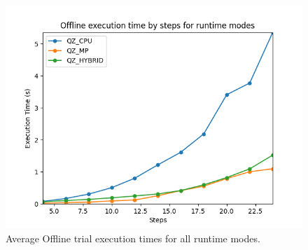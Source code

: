 \documentclass[runningheads]{llncs}
\begin{document}
\begin{figure}[t]
\includegraphics[width=\textwidth]{profiler_out/offline_avg_unified.png}
\caption{Average Offline trial execution times for all runtime modes.} \label{offline_avg}
\end{figure}
\end{document}
